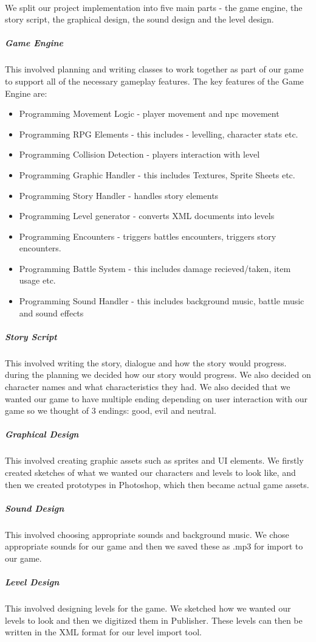 \documentclass{article}
\begin{document}
\paragraph{}
We split our project implementation into five main parts - the game engine, the story script, the graphical design, the sound design and the level design.
\subparagraph{Game Engine}
This involved planning and writing classes to work together as part of our game to support all of the necessary gameplay features. The key features of the Game Engine are: 
\begin{itemize}
\item Programming Movement Logic - player movement and npc movement
\item Programming RPG Elements - this includes - levelling, character stats etc.
\item Programming Collision Detection - players interaction with level
\item Programming Graphic Handler - this includes Textures, Sprite Sheets etc.
\item Programming Story Handler - handles story elements
\item Programming Level generator - converts XML documents into levels 
\item Programming Encounters - triggers battles encounters, triggers story encounters.   
\item Programming Battle System - this includes damage recieved/taken, item usage etc.
\item Programming Sound Handler - this includes background music, battle music and sound effects 
\end{itemize}
\subparagraph{Story Script}
This involved writing the story, dialogue and how the story would progress. during the planning we decided how our story would progress. We also decided on character names and what characteristics they had. We also decided that we wanted our game to have multiple ending depending on user interaction with our game so we thought of 3 endings: good, evil and neutral. 
\subparagraph{Graphical Design}
This involved creating graphic assets such as sprites and UI elements. We firstly created sketches of what we wanted our characters and levels to look like, and then we created prototypes in Photoshop, which then became actual game assets.
\subparagraph{Sound Design}
This involved choosing appropriate sounds and background music. We chose appropriate sounds for our game and then we saved these as .mp3 for import to our game.
\subparagraph{Level Design}
This involved designing levels for the game. We sketched how we wanted our levels to look and then we digitized them in Publisher. These levels can then be written in the XML format for our level import tool.
\end{document}
